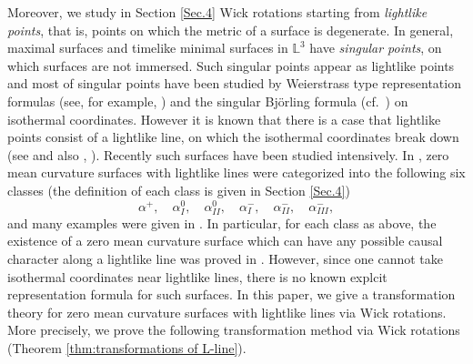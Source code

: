 \documentclass[12pt,amstex]{amsart}%
\theoremstyle{plain} %
\theoremstyle{definition}
\begin{document}
Moreover, we study in Section \ref{Sec.4} Wick rotations starting from {\it lightlike points}, that is, points on which the metric of a surface is degenerate. In general, maximal surfaces and timelike minimal surfaces in $\mathbb{L}^3$ have {\it singular points}, on which surfaces are not immersed. Such singular points appear as lightlike points and most of singular points have been studied by Weierstrass type representation formulas (see, for example, \cite{ER,FLS,FujimoriETAL3,Kobayashi,UY06}) and the singular Bj\"orling formula (cf.\ \cite{KKSY,KY}) on isothermal coordinates. However it is known that there is a case that lightlike points consist of a lightlike line, on which the isothermal coordinates break down (see \cite[Section 1]{FujimoriETAL1} and also \cite[Lemma 3.2]{KKSY}, \cite[Corollary 3.3]{KY}). Recently such surfaces have been studied intensively. In \cite{FujimoriETAL1}, zero mean curvature surfaces with lightlike lines were categorized into the following six classes (the definition of each class is given in Section \ref{Sec.4})
\[
\alpha^+,\quad \alpha^0_I,\quad \alpha^0_{II},\quad \alpha^-_{I},\quad \alpha^-_{II},\quad \alpha^-_{III},
\]
and many examples were given in \cite{A1,FujimoriETAL1,FujimoriETAL2,FujimoriETAL3,UY}. In particular, for each class as above, the existence of a zero mean curvature surface which can have any possible causal character along a lightlike line was proved in \cite{UY}. However, since one cannot take isothermal coordinates near lightlike lines, there is no known explcit representation formula for such surfaces. In this paper, we give a transformation theory for zero mean curvature surfaces with lightlike lines via Wick rotations. More precisely, we prove the following transformation method via Wick rotations (Theorem \ref{thm:transformations of L-line}).
\end{document}
